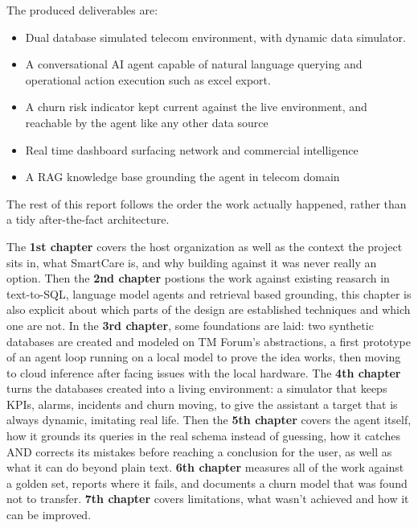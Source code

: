 The produced deliverables are:
\begin{itemize}
    \item Dual database simulated telecom environment, with dynamic data simulator.
    \item A conversational AI agent capable of natural language querying and operational action execution such as excel export.
    \item A churn risk indicator kept current against the live environment, and
    reachable by the agent like any other data source
    \item Real time dashboard surfacing network and commercial intelligence
    \item A RAG knowledge base grounding the agent in telecom domain
\end{itemize}

The rest of this report follows the order the work actually happened, rather than
a tidy after-the-fact architecture.

The \textbf{1st chapter} covers the host organization as well as the context the 
project sits in, what SmartCare is, and why building against it was never really 
an option. Then the \textbf{2nd chapter} postions the work against existing 
reasarch in text-to-SQL, language model agents and retrieval based grounding, this chapter
is also explicit about which parts of the design are established techniques and 
which one are not. In the \textbf{3rd chapter}, some foundations are laid: two synthetic
databases are created and modeled on TM Forum's abstractions, a first prototype of an agent 
loop running on a local model to prove the idea works, then moving to cloud inference after 
facing issues with the local hardware. The \textbf{4th chapter} turns the databases created into 
a living environment: a simulator that keeps KPIs, alarms, incidents and churn moving, to give 
the assistant a target that is always dynamic, imitating real life. Then the \textbf{5th chapter}
covers the agent itself, how it grounds its queries in the real schema instead of guessing, 
how it catches AND corrects its mistakes before reaching a conclusion for the user, as well as what it can 
do beyond plain text. \textbf{6th chapter} measures all of the work against a golden set, reports 
where it fails, and documents a churn model that was found not to transfer. \textbf{7th chapter} covers limitations, 
what wasn't achieved and how it can be improved.
